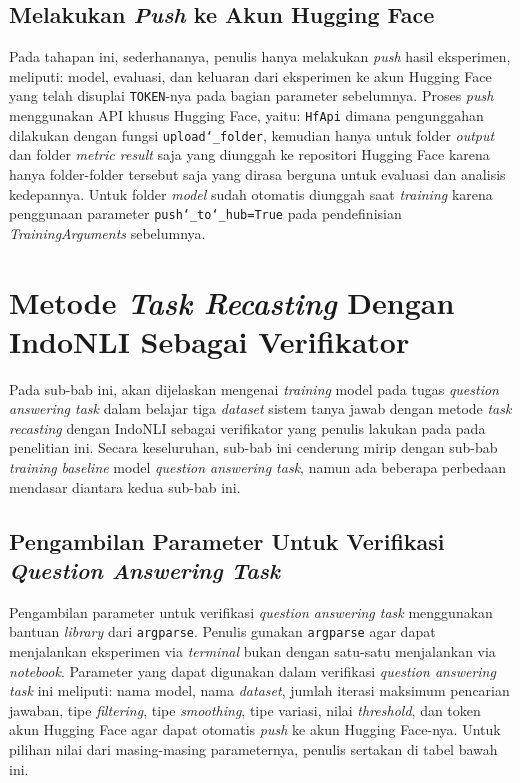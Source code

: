 \subsection{Melakukan \emph{Push} ke Akun Hugging Face}
Pada tahapan ini, sederhananya, penulis hanya melakukan \emph{push} hasil eksperimen, meliputi: model, evaluasi, dan keluaran dari eksperimen ke akun Hugging Face yang telah disuplai \texttt{TOKEN}-nya pada bagian parameter sebelumnya. Proses \emph{push} menggunakan API khusus Hugging Face, yaitu: \texttt{HfApi} dimana pengunggahan dilakukan dengan fungsi \texttt{upload\char`_folder}, kemudian hanya untuk folder \emph{output} dan folder \emph{metric result} saja yang diunggah ke repositori Hugging Face karena hanya folder-folder tersebut saja yang dirasa berguna untuk evaluasi dan analisis kedepannya. Untuk folder \emph{model} sudah otomatis diunggah saat \emph{training} karena penggunaan parameter \texttt{push\char`_to\char`_hub=True} pada pendefinisian \emph{TrainingArguments} sebelumnya.

\section{Metode \emph{Task Recasting} Dengan IndoNLI Sebagai Verifikator}
Pada sub-bab ini, akan dijelaskan mengenai \emph{training} model pada tugas \emph{question answering task} dalam belajar tiga \emph{dataset} sistem tanya jawab dengan metode \emph{task recasting} dengan IndoNLI sebagai verifikator yang penulis lakukan pada pada penelitian ini. Secara keseluruhan, sub-bab ini cenderung mirip dengan sub-bab \emph{training} \emph{baseline} model \emph{question answering task}, namun ada beberapa perbedaan mendasar diantara kedua sub-bab ini.

\subsection{Pengambilan Parameter Untuk Verifikasi \emph{Question Answering Task}}
Pengambilan parameter untuk verifikasi \emph{question answering task} menggunakan bantuan \emph{library} dari \texttt{argparse}. Penulis gunakan \texttt{argparse} agar dapat menjalankan eksperimen via \emph{terminal} bukan dengan satu-satu menjalankan via \emph{notebook}. Parameter yang dapat digunakan dalam verifikasi \emph{question answering task} ini meliputi: nama model, nama \emph{dataset}, jumlah iterasi maksimum pencarian jawaban, tipe \emph{filtering}, tipe \emph{smoothing}, tipe variasi, nilai \emph{threshold}, dan token akun Hugging Face agar dapat otomatis \emph{push} ke akun Hugging Face-nya. Untuk pilihan nilai dari masing-masing parameternya, penulis sertakan di tabel bawah ini.


